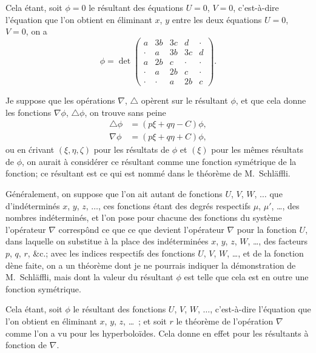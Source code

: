 \documentclass[11pt,a4paper]{article}
\begin{document}
\medskip

Cela \'etant, soit $\phi = 0$ le r\'esultant des \'equations $U = 0$, $V = 0$, c'est-\`a-dire l'\'equation que l'on obtient en \'eliminant $x$, $y$ entre les deux \'equations $U = 0$, $V = 0$, on a
\[
\phi = \det\begin{pmatrix}
a & 3b & 3c & d & \cdot\\
\cdot & a & 3b & 3c & d\\
a & 2b & c & \cdot & \cdot\\
\cdot & a & 2b & c & \cdot\\
\cdot & \cdot & a & 2b & c
\end{pmatrix}.
\]

Je suppose que les op\'erations $\nabla$, $\bigtriangleup$ op\`erent sur le r\'esultant $\phi$, et que cela donne les fonctions $\nabla\phi$, $\bigtriangleup\phi$, on trouve sans peine
\begin{align*}
\bigtriangleup\phi &= (p\xi + q\eta - C)\phi,\\
\nabla\phi &= (p\xi + q\eta + C)\phi,
\end{align*}
ou en \'crivant $(\xi, \eta, \zeta)$ pour les r\'esultats de $\phi$ et $(\xi)$ pour les m\^emes r\'esultats de $\phi$, on aurait \`a consid\'erer ce r\'esultant comme une fonction sym\'etrique de la fonction; ce r\'esultant est ce qui est nomm\'e dans le th\'eor\`eme de M.\ Schl\"affli.

\medskip

G\'en\'eralement, on suppose que l'on ait autant de fonctions $U$, $V$, $W$, $\ldots$ que d'ind\'etermin\'es $x$, $y$, $z$, $\ldots$, ces fonctions \'etant des degr\'es respectifs $\mu$, $\mu'$, \ldots, des nombres ind\'etermin\'es, et l'on pose pour chacune des fonctions du syst\`eme l'op\'erateur $\nabla$ corresp\^ond ce que ce que devient l'op\'erateur $\nabla$ pour la fonction $U$, dans laquelle on substitue \`a la place des ind\'etermin\'ees $x$, $y$, $z$, $W$, \ldots, des facteurs $p$, $q$, $r$, \&c.; avec les indices respectifs des fonctions $U$, $V$, $W$, \ldots, et de la fonction d\`ene faite, on a un th\'eor\`eme dont je ne pourrais indiquer la d\'emonstration de M.\ Schl\"affli, mais dont la valeur du r\'esultant $\phi$ est telle que cela est en outre une fonction sym\'etrique.

\medskip

Cela \'etant, soit $\phi$ le r\'esultant des fonctions $U$, $V$, $W$, $\ldots$, c'est-\`a-dire l'\'equation que l'on obtient en \'eliminant $x$, $y$, $z$, \ldots\ ; et soit $r$ le th\'eor\`eme de l'op\'eration $\nabla$ comme l'on a vu pour les hyperbolo\"ides. Cela donne en effet pour les r\'esultants \`a fonction de $\nabla$.
\end{document}
